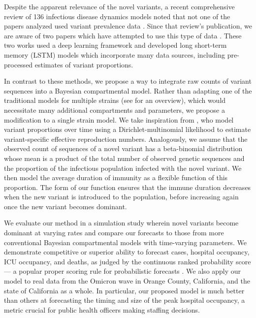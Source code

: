 Despite the apparent relevance of the novel variants, a recent comprehensive review of 136 infectious disease dynamics models noted that not one of the papers analyzed used variant prevalence data \citep{Nixon2022evaluation}.
Since that review's publication, we are aware of two papers which have attempted to use this type of data \citep{Du2023Incorporating, Rashed2022Covid}.
These two works used a deep learning framework and developed long short-term memory (LSTM) models which incorporate many data sources, including pre-processed estimates of variant proportions.

In contrast to these methods, we propose a way to integrate raw counts of variant sequences into a Bayesian compartmental model.
Rather than adapting one of the traditional models for multiple strains (see \citet{Kucharski2016Capturing} for an overview), which would necessitate many additional compartments and parameters, we propose a modification to a single strain model.
We take inspiration from \citet{Figgins2021variant}, who model variant proportions over time using a Dirichlet-multinomial likelihood to estimate variant-specific effective reproduction numbers.
Analogously, we assume that the observed count of sequences of a novel variant has a beta-binomial distribution whose mean is a product of the total number of observed genetic sequences and the proportion of the infectious population infected with the novel variant.
We then model the average duration of immunity as a flexible function of this proportion.
The form of our function ensures that the immune duration decreases when the new variant is introduced to the population, before increasing again once the new variant becomes dominant.

We evaluate our method in a simulation study wherein novel variants become dominant at varying rates and compare our forecasts to those from more conventional Bayesian compartmental models with time-varying parameters.
We demonstrate competitive or superior ability to forecast cases, hospital occupancy, ICU occupancy, and deaths, as judged by the continuous ranked probability score --- a popular proper scoring rule for probabilistic forecasts \citep{gneiting2007strictly}.
We also apply our model to real data from the Omicron wave in Orange County, California, and the state of California as a whole.
In particular, our proposed model is much better than others at forecasting the timing and size of the peak hospital occupancy, a metric crucial for public health officers making staffing decisions.


